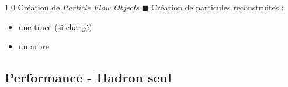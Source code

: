 \documentclass[8pt]{beamer}
\begin{document}
\begin{frame}
\begin{minipage}{0.415\linewidth}
\begin{center}
      \end{center}
      \begin{block}{\textcircled{{\footnotesize 10}} Création de \textit{Particle Flow Objects}}
        $\blacksquare$ Création de particules reconstruites :
        \begin{itemize}
          \item une trace (si chargé)
          \item un arbre
        \end{itemize}
      \end{block} 
    \end{minipage}
  \end{frame}
  
  \subsection{Performance - Hadron seul}
\end{document}
